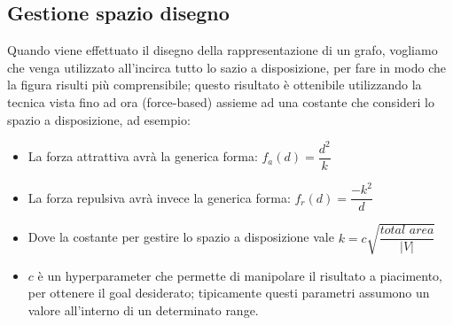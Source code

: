 \documentclass[12pt,a4paper]{article}
\begin{document}
\subsection{Gestione spazio disegno}
Quando viene effettuato il disegno della rappresentazione di un grafo, vogliamo che venga utilizzato all'incirca tutto lo sazio a disposizione, per fare in modo che la figura risulti più comprensibile; questo risultato è ottenibile utilizzando la tecnica vista fino ad ora (force-based) assieme ad una costante che consideri lo spazio a disposizione, ad esempio:
\begin{itemize}
\item La forza attrattiva avrà la generica forma: $f_a (d) = \dfrac{d^2}{k}$
\item La forza repulsiva avrà invece la generica forma: $f_r (d) = \dfrac{-k^2}{d}$
\item Dove la costante per gestire lo spazio a disposizione vale $k = c \sqrt{\dfrac{\textit{total area}}{\vert V \vert}}$
\item $c$ è un hyperparameter che permette di manipolare il risultato a piacimento, per ottenere il goal desiderato; tipicamente questi parametri assumono un valore all'interno di un determinato range.
\end{itemize}
\end{document}
